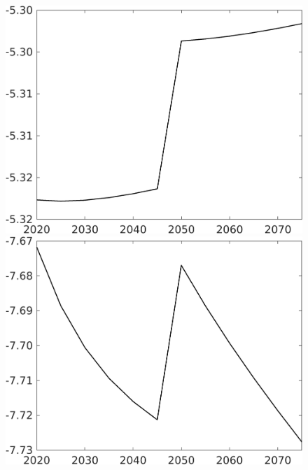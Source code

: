 \documentclass[12pt]{article}
\begin{document}
\begin{figure}[h!!]
\begin{minipage}[]{0.32\textwidth}
	\end{minipage}	
	\begin{minipage}[]{0.32\textwidth}
		\includegraphics[width=1\textwidth]{../../codding_model/own_basedOnFried/optimalPol_010922_revision/figures/all_13Sept22/CompTaufPER_bytaul_Reg0_hl_spillover0_nsk0_xgr1_knspil0_sep1_LFlimit1_emsbase0_countec0_GovRev0_etaa0.79_lgd0.png}
	\end{minipage}	
	\begin{minipage}[]{0.32\textwidth}
		\includegraphics[width=1\textwidth]{../../codding_model/own_basedOnFried/optimalPol_010922_revision/figures/all_13Sept22/CompTaufPER_bytaul_Reg0_C_spillover0_nsk0_xgr1_knspil0_sep1_LFlimit1_emsbase0_countec0_GovRev0_etaa0.79_lgd0.png}

\end{minipage}
\end{figure}
\end{document}

